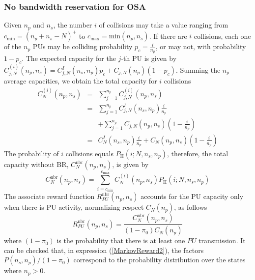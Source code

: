 \subsubsection{No bandwidth reservation for OSA}
Given $n_{p}$ and $n_{s}$, the number $i$ of collisions may take a value ranging from $c_{\text{min}} = \left(n_{p}+n_{s}-N\right)^{+}$ to $c_{\text{max}} = \text{min}\left(n_{p},n_{s}\right)$.
If there are $i$ collisions, each one of the $n_{p}$ PUs may be colliding probability $p_{c} = \frac{i}{n_{p}}$, or may not, with probability $1-p_{c}$. The expected capacity for the $j$-th PU is given by $C^{(i)}_{j,N}\left(n_{p},n_{s}\right) = C^{I}_{j,N}(n_{s},n_{p})p_{c} + C_{j,N}(n_{p})\left(1-p_{c}\right)$.
Summing the $n_{p}$ average capacities, we obtain the total capacity for $i$ collisions
\begin{equation}\label{CiN}
\begin{array}{lcl}
C^{(i)}_{N}\left(n_{p},n_{s}\right) & = & \sum_{j=1}^{n_{p}}C^{(i)}_{j,N}\left(n_{p},n_{s}\right)\\
& = & \sum_{j=1}^{n_{p}}C^{I}_{j,N}(n_{s},n_{p})\frac{i}{n_{p}} \\
& & + \sum_{j=1}^{n_{p}}C_{j,N}\left(n_{p},n_{s}\right)\left(1-\frac{i}{n_{p}}\right)\\
& = & C^{I}_{N}(n_{s},n_{p})\frac{i}{n_{p}} + C_{N}\left(n_{p},n_{s}\right)\left(1-\frac{i}{n_{p}}\right)
\end{array}
\end{equation}
The probability of $i$ collisions equals $P_{\text{H}}\left(i;N,n_{s},n_{p}\right)$, therefore, the total capacity without BR, $C^{\text{nbr}}_{N}\left(n_{p},n_{s}\right)$, is given by
\begin{equation}\label{CNOBR}
C^{\text{nbr}}_{N}\left(n_{p},n_{s}\right) = \displaystyle\sum_{i=c_{\text{min}}}^{c_{\text{max}}}C^{(i)}_{N}\left(n_{p},n_{s}\right)P_{\text{H}}\left(i;N,n_{s},n_{p}\right)
\end{equation}
The associate reward function $R^{\text{nbr}}_{PU}\left(n_{p},n_{s}\right)$ accounts for the PU capacity only when there is PU activity, normalizing respect $C_{N}\left(n_{p}\right)$, as follows
\begin{equation}\label{Roff}
R^{\text{nbr}}_{PU}\left(n_{p},n_{s}\right) = \displaystyle\frac{C^{\text{nbr}}_{N}\left(n_{p},n_{s}\right)}
{\left(1-\pi_{0}\right)C_{N}\left(n_{p}\right)}
\end{equation}
where $(1-\pi_{0})$ is the probability that there is at least one $PU$ transmission. It can be checked that, in expression (\ref{MarkovReward2}), the factors $P\left(n_{s},n_{p}\right)/\left(1-\pi_{0}\right)$ correspond to the probability distribution over the states where $n_{p}>0$.

